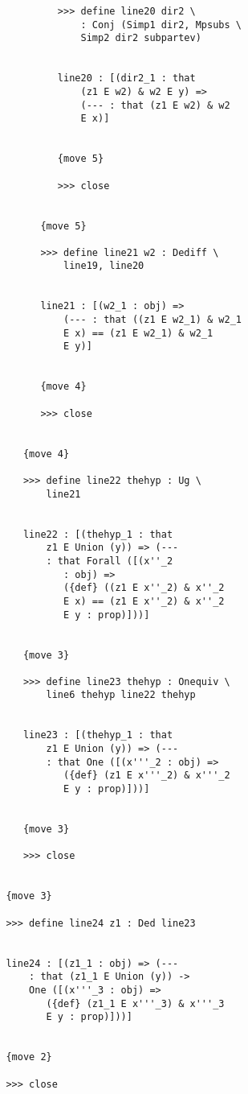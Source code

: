 \documentclass[12pt]{article}
\begin{document}
\begin{verbatim}
                  >>> define line20 dir2 \
                      : Conj (Simp1 dir2, Mpsubs \
                      Simp2 dir2 subpartev)


                  line20 : [(dir2_1 : that 
                      (z1 E w2) & w2 E y) => 
                      (--- : that (z1 E w2) & w2 
                      E x)]


                  {move 5}

                  >>> close


               {move 5}

               >>> define line21 w2 : Dediff \
                   line19, line20


               line21 : [(w2_1 : obj) => 
                   (--- : that ((z1 E w2_1) & w2_1 
                   E x) == (z1 E w2_1) & w2_1 
                   E y)]


               {move 4}

               >>> close


            {move 4}

            >>> define line22 thehyp : Ug \
                line21


            line22 : [(thehyp_1 : that 
                z1 E Union (y)) => (--- 
                : that Forall ([(x''_2 
                   : obj) => 
                   ({def} ((z1 E x''_2) & x''_2 
                   E x) == (z1 E x''_2) & x''_2 
                   E y : prop)]))]


            {move 3}

            >>> define line23 thehyp : Onequiv \
                line6 thehyp line22 thehyp


            line23 : [(thehyp_1 : that 
                z1 E Union (y)) => (--- 
                : that One ([(x'''_2 : obj) => 
                   ({def} (z1 E x'''_2) & x'''_2 
                   E y : prop)]))]


            {move 3}

            >>> close


         {move 3}

         >>> define line24 z1 : Ded line23


         line24 : [(z1_1 : obj) => (--- 
             : that (z1_1 E Union (y)) -> 
             One ([(x'''_3 : obj) => 
                ({def} (z1_1 E x'''_3) & x'''_3 
                E y : prop)]))]


         {move 2}

         >>> close



\end{verbatim}
\end{document}

